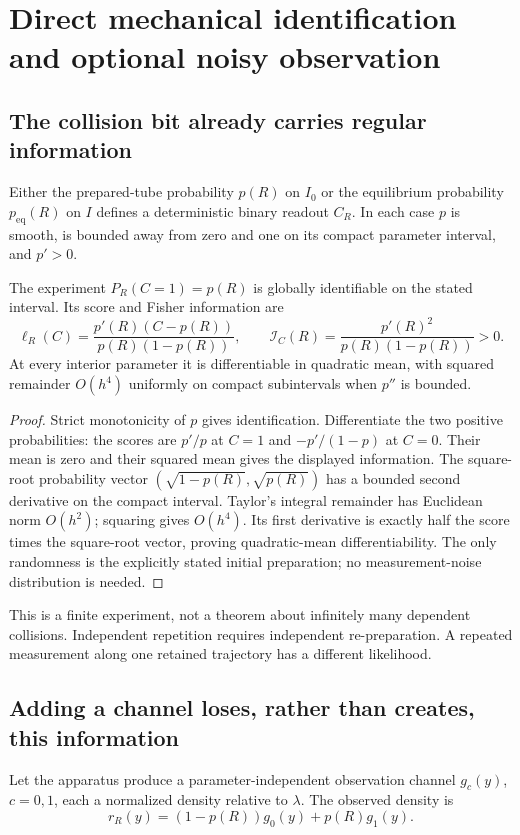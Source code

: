 \section{Direct mechanical identification and optional noisy observation}\label{sec:observation}
\subsection{The collision bit already carries regular information}
Either the prepared-tube probability $p(R)$ on $I_0$ or the equilibrium probability $p_{\mathrm{eq}}(R)$ on $I$ defines a deterministic binary readout $C_R$. In each case $p$ is smooth, is bounded away from zero and one on its compact parameter interval, and $p'>0$.

\begin{theorem}\label{thm:binary-info}
The experiment $P_R(C=1)=p(R)$ is globally identifiable on the stated interval. Its score and Fisher information are
\[
 \ell_R(C)=\frac{p'(R)(C-p(R))}{p(R)(1-p(R))},\qquad
 \mathcal I_C(R)=\frac{p'(R)^2}{p(R)(1-p(R))}>0.
\]
At every interior parameter it is differentiable in quadratic mean, with squared remainder $O(h^4)$ uniformly on compact subintervals when $p''$ is bounded.
\end{theorem}
\begin{proof}
Strict monotonicity of $p$ gives identification. Differentiate the two positive probabilities: the scores are $p'/p$ at $C=1$ and $-p'/(1-p)$ at $C=0$. Their mean is zero and their squared mean gives the displayed information. The square-root probability vector
$(\sqrt{1-p(R)},\sqrt{p(R)})$ has a bounded second derivative on the compact interval. Taylor's integral remainder has Euclidean norm $O(h^2)$; squaring gives $O(h^4)$. Its first derivative is exactly half the score times the square-root vector, proving quadratic-mean differentiability. The only randomness is the explicitly stated initial preparation; no measurement-noise distribution is needed.
\end{proof}

This is a finite experiment, not a theorem about infinitely many dependent collisions. Independent repetition requires independent re-preparation. A repeated measurement along one retained trajectory has a different likelihood.

\subsection{Adding a channel loses, rather than creates, this information}
Let the apparatus produce a parameter-independent observation channel $g_c(y)$, $c=0,1$, each a normalized density relative to $\lambda$. The observed density is
\[
 r_R(y)=(1-p(R))g_0(y)+p(R)g_1(y).
\]

